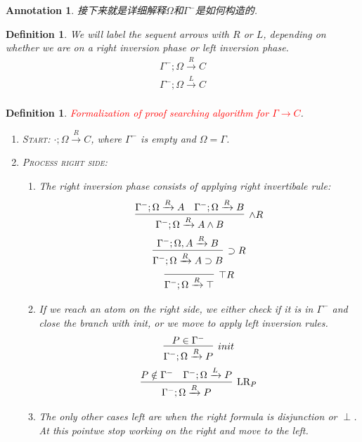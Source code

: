 \documentclass{article}
\theoremstyle{plain}
\newtheorem{definition}[theorem]{Definition}
\newtheorem{annotation}[theorem]{Annotation}
\newcounter{case}
\theoremstyle{nonumberplain}
\newcommand{\redt}[1]{\textcolor{red}{#1}}
\begin{document}
\begin{annotation}
\rm 接下来就是详细解释$\Omega$和$\Gamma^-$是如何构造的.
\end{annotation}

\begin{definition}
\rm We will label the sequent arrows with $R$ or $L$, depending on whether we are on a right inversion phase or left inversion phase.
$$
\begin{gathered}
\Gamma^-;\Omega \xrightarrow{R} C \\
\Gamma^-;\Omega \xrightarrow{L} C \\
\end{gathered}
$$
\end{definition}


\begin{definition}
\rm \redt{Formalization of proof searching algorithm for $\Gamma \to C$}.
\begin{enumerate}
	\item \textsc{Start}: $\cdot;\Omega \xrightarrow{R} C$, where $\Gamma^-$ is empty and $\Omega = \Gamma$. 
	\item \textsc{Process right side}: 
	\begin{enumerate}
		\item The right inversion phase consists of applying right invertibale rule:
	$$
	\begin{gathered}
	\infer[\wedge R]{\Gamma^-; \Omega \xrightarrow{R} A \wedge B}{\Gamma^-; \Omega \xrightarrow{R} A & \Gamma^-; \Omega \xrightarrow{R} B} \\
	\infer[\supset R]{\Gamma^-; \Omega \xrightarrow{R} A \supset B}{\Gamma^-; \Omega, A \xrightarrow{R} B} \\
	\infer[\top R]{\Gamma^-; \Omega \xrightarrow{R} \top}{}
	\end{gathered}
	$$
		\item If we reach an atom on the right side, we either check if it is in $\Gamma^-$ and close the branch with \emph{init}, or we move to apply left inversion rules.
		$$
		\begin{gathered}
		\infer[init]{\Gamma^-; \Omega \xrightarrow{R} P}{P \in \Gamma^-} \\
		\infer[\text{LR}_P]{\Gamma^-; \Omega \xrightarrow{R} P}{P \notin \Gamma^- & \Gamma^-; \Omega \xrightarrow{L} P}
		\end{gathered}
		$$
		\item The only other cases left are when the right formula is disjunction or $\perp$. At this pointwe stop working on the right and move to the left.

\end{enumerate}
\end{enumerate}
\end{definition}
\end{document}
